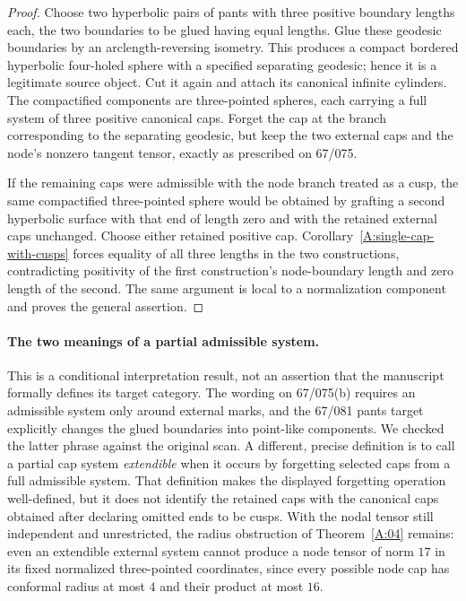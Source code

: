 \begin{proof}
Choose two hyperbolic pairs of pants with three positive boundary
lengths each, the two boundaries to be glued having equal lengths.
Glue these geodesic boundaries by an arclength-reversing isometry.
This produces a compact bordered hyperbolic four-holed sphere with
a specified separating geodesic; hence it is a legitimate source
object. Cut it again and attach its canonical infinite cylinders.
The compactified components are three-pointed spheres, each
carrying a full system of three positive canonical caps. Forget
the cap at the branch corresponding to the separating geodesic,
but keep the two external caps and the node's nonzero tangent
tensor, exactly as prescribed on 67/075.

If the remaining caps were admissible with the node branch treated
as a cusp, the same compactified three-pointed sphere would be
obtained by grafting a second hyperbolic surface with that end of
length zero and with the retained external caps unchanged.
Choose either retained positive cap. Corollary~\ref{A:single-cap-with-cusps}
forces equality of all three lengths in the two constructions,
contradicting positivity of the first construction's node-boundary
length and zero length of the second. The same argument is local
to a normalization component and proves the general assertion.
\end{proof}

\paragraph{The two meanings of a partial admissible system.}
This is a conditional interpretation result, not an assertion that
the manuscript formally defines its target category. The wording
on 67/075(b) requires an admissible system only around external
marks, and the 67/081 pants target explicitly changes the glued
boundaries into point-like components. We checked the latter phrase
against the original scan. A different, precise definition is to
call a partial cap system \emph{extendible} when it occurs by
forgetting selected caps from a full admissible system. That
definition makes the displayed forgetting operation well-defined,
but it does not identify the retained caps with the canonical caps
obtained after declaring omitted ends to be cusps. With the nodal
tensor still independent and unrestricted, the radius obstruction
of Theorem~\ref{A:04} remains: even an extendible external system
cannot produce a node tensor of norm $17$ in its fixed normalized
three-pointed coordinates, since every possible node cap has
conformal radius at most $4$ and their product at most $16$.

